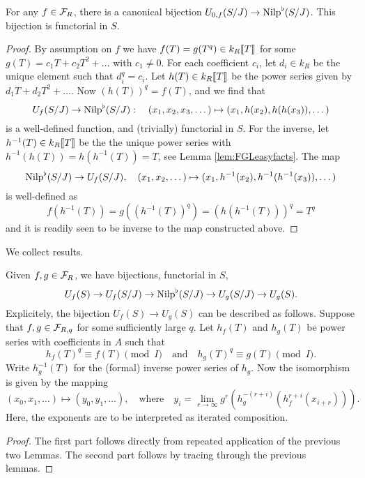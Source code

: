 \begin{lem}\label{lem:nilp0iso}
  For any $f \in \mathcal{F}_R$, there is a canonical 
  bijection $U_{0,f}(S/J) \to {\mathrm{Nilp}}^\flat(S/J)$. This bijection is functorial in 
  $S$.
\begin{proof}
  By assumption on $f$ we have $f(T) = g(T^{q}) \in k_R\llbracket T \rrbracket$ for some 
  $g(T) = c_1T + c_2T^2 + \dots$ with $c_1 \neq 0$. For each coefficient $c_i$, let
  $d_i \in k_R$ be the unique element such that $d_i^{q} = c_i$. Let
  $h(T) \in k_R\llbracket T \rrbracket$ be the power series given by $d_1 T + d_2
  T^2 + \dots$. Now $(h(T))^{q}=f(T)$, and we find that 
  \begin{equation*}
      U_f(S/J) \to {\mathrm{Nilp}}^\flat(S/J): \quad
      (x_1, x_2, x_3, \dots) \mapsto (x_1, h(x_2), h(h(x_3)), \dots)
  \end{equation*}
  is a well-defined function, and (trivially) functorial in $S$. For the
  inverse, let $h^{-1}(T) \in k_R\llbracket T \rrbracket$ be the the unique power
  series with $h^{-1}(h(T))= h(h^{-1}(T)) = T$, see Lemma
  \ref{lem:FGLeasyfacts}. The map
  \begin{equation*}
      {\mathrm{Nilp}}^\flat(S/J) \to U_f(S/J), \quad 
      (x_1, x_2, \dots ) \mapsto (x_1, h^{-1}(x_2), h^{-1}(h^{-1}(x_3)), \dots)
  \end{equation*}
  is well-defined as
  \begin{equation*}
      f(h^{-1}(T)) = g((h^{-1}(T))^{q}) = (h(h^{-1}(T)))^{q} =
      T^{q}
  \end{equation*}
  and it is readily seen to be inverse to the map constructed above.
\end{proof}
\end{lem}

We collect results.
\begin{prop}\label{prop:pHTcalc}
  Given $f,g \in \mathcal{F}_R$, we have bijections, functorial in $S$,
  \begin{equation} 
    U_f(S) \to U_f(S/J) \to {\mathrm{Nilp}}^\flat(S/J) \to U_g(S/J) \to U_g(S).
  \end{equation}
  Explicitely, the bijection $U_f(S) \to U_g(S)$ can be described as follows.
  Suppose that $f,g \in \mathcal{F}_{R,q}$ for some sufficiently large $q$. 
  Let $h_f(T)$ and $h_g(T)$ be power series with coefficients in $A$ such that 
  $$h_f(T)^q \equiv f(T) \pmod I\quad\text{and}\quad h_g(T)^q \equiv g(T) \pmod
  I.$$
  Write $h_g^{-1}(T)$ for the (formal) inverse power series of $h_g$. 
  Now the isomorphism is given by the mapping
  \begin{equation*}
    (x_0, x_1, \dots) \mapsto (y_0, y_1, \dots), \quad \text{where} \quad y_i =
    \lim_{r \to \infty} g^r(h_g^{-(r+i)}(h_f^{r+i} (x_{i+r}))).
  \end{equation*}
  Here, the exponents are to be interpreted as iterated composition.
\begin{proof}
  The first part follows directly from repeated application of the previous
  two Lemmas. The second part follows by tracing through the previous lemmas.  
\end{proof}
\end{prop}
